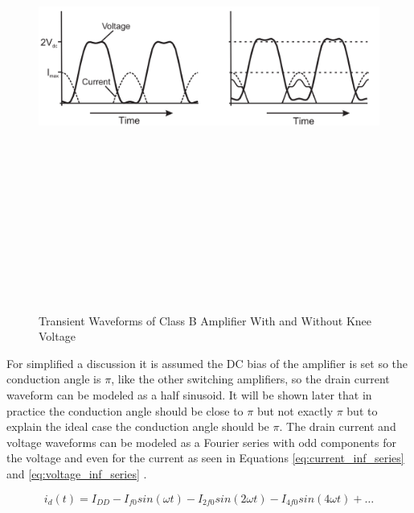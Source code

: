 \begin{figure}
  \centering
  \includegraphics[width=6in,height=6in,keepaspectratio]{figures/detail/knee_harmonics}\\
  \caption{Transient Waveforms of Class B Amplifier With and Without Knee Voltage \cite{C.Cripps2006}}
  \label{fig:knee_harmonics}
\end{figure}

For simplified a discussion it is assumed the DC bias of the amplifier is set so the conduction angle is $\pi$, like the other switching amplifiers, so the drain current waveform can be modeled as a half sinusoid. It will be shown later that in practice the conduction angle should be close to $\pi$ but not exactly $\pi$ but to explain the ideal case the conduction angle should be $\pi$. The drain current and voltage waveforms can be modeled as a Fourier series with odd components for the voltage and even for the current as seen in Equations \ref{eq:current_inf_series} and \ref{eq:voltage_inf_series} \cite{Raab1997}. 

\begin{equation}\label{eq:current_inf_series}
  i_{d}(t) = I_{DD} - I_{f0}sin(\omega t) - I_{2f0}sin(2\omega t) - I_{4f0}sin(4\omega t) + \ldots
\end{equation}

